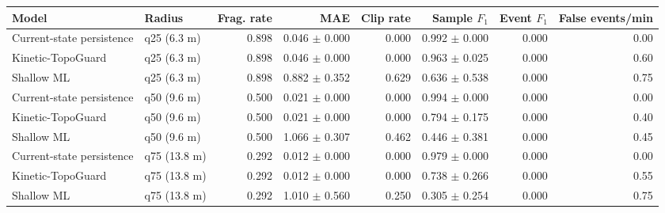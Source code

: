\begin{tabular}{llrrrrrr}
\toprule
Model & Radius & Frag. rate & MAE & Clip rate & Sample $F_1$ & Event $F_1$ & False events/min \\
\midrule
Current-state persistence & q25 (6.3 m) & 0.898 & 0.046 $\pm$ 0.000 & 0.000 & 0.992 $\pm$ 0.000 & 0.000 & 0.00 \\
Kinetic-TopoGuard & q25 (6.3 m) & 0.898 & 0.046 $\pm$ 0.000 & 0.000 & 0.963 $\pm$ 0.025 & 0.000 & 0.60 \\
Shallow ML & q25 (6.3 m) & 0.898 & 0.882 $\pm$ 0.352 & 0.629 & 0.636 $\pm$ 0.538 & 0.000 & 0.75 \\
Current-state persistence & q50 (9.6 m) & 0.500 & 0.021 $\pm$ 0.000 & 0.000 & 0.994 $\pm$ 0.000 & 0.000 & 0.00 \\
Kinetic-TopoGuard & q50 (9.6 m) & 0.500 & 0.021 $\pm$ 0.000 & 0.000 & 0.794 $\pm$ 0.175 & 0.000 & 0.40 \\
Shallow ML & q50 (9.6 m) & 0.500 & 1.066 $\pm$ 0.307 & 0.462 & 0.446 $\pm$ 0.381 & 0.000 & 0.45 \\
Current-state persistence & q75 (13.8 m) & 0.292 & 0.012 $\pm$ 0.000 & 0.000 & 0.979 $\pm$ 0.000 & 0.000 & 0.00 \\
Kinetic-TopoGuard & q75 (13.8 m) & 0.292 & 0.012 $\pm$ 0.000 & 0.000 & 0.738 $\pm$ 0.266 & 0.000 & 0.55 \\
Shallow ML & q75 (13.8 m) & 0.292 & 1.010 $\pm$ 0.560 & 0.250 & 0.305 $\pm$ 0.254 & 0.000 & 0.75 \\
\bottomrule
\end{tabular}